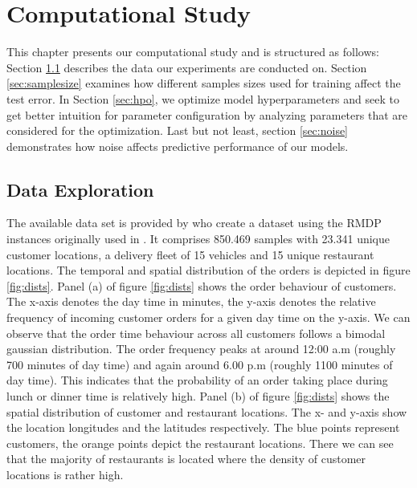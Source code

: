 \chapter{Computational Study}\label{chap:comp}

This chapter presents our computational study and is structured as follows: 
Section \ref{sec:data} describes the data our experiments are conducted on.
Section \ref{sec:samplesize} examines how different samples sizes used for training affect the test error.
In Section \ref{sec:hpo}, we optimize model hyperparameters and seek to get better intuition for parameter configuration by analyzing parameters that are considered for the optimization.
Last but not least, section \ref{sec:noise} demonstrates how noise affects predictive performance of our models.

\section{Data Exploration}\label{sec:data}
The available data set is provided by \cite{Hildebrandt2020_EAT} who create a dataset using the RMDP instances originally used in \cite{UlmerRMDP}. It comprises 850.469 samples with 23.341 unique customer locations, a delivery fleet of 15 vehicles and 15 unique restaurant locations. The temporal and spatial distribution of the orders is depicted in figure \ref{fig:dists}. 
Panel (a) of figure \ref{fig:dists} shows the order behaviour of customers. The x-axis denotes the day time in minutes, the y-axis denotes the relative frequency of incoming customer orders for a given day time on the y-axis. We can observe that the order time behaviour across all customers follows a bimodal gaussian distribution. The order frequency peaks at around 12:00 a.m (roughly 700 minutes of day time) and again around 6.00 p.m (roughly 1100 minutes of day time). This indicates that the probability of an order taking place during lunch or dinner time is relatively high.  
Panel (b) of figure \ref{fig:dists} shows the spatial distribution of customer and restaurant locations. The x- and y-axis show the location longitudes and the latitudes respectively. The blue points represent customers, the orange points depict the restaurant locations. There we can see that the majority of restaurants is located where the density of customer locations is rather high. 
